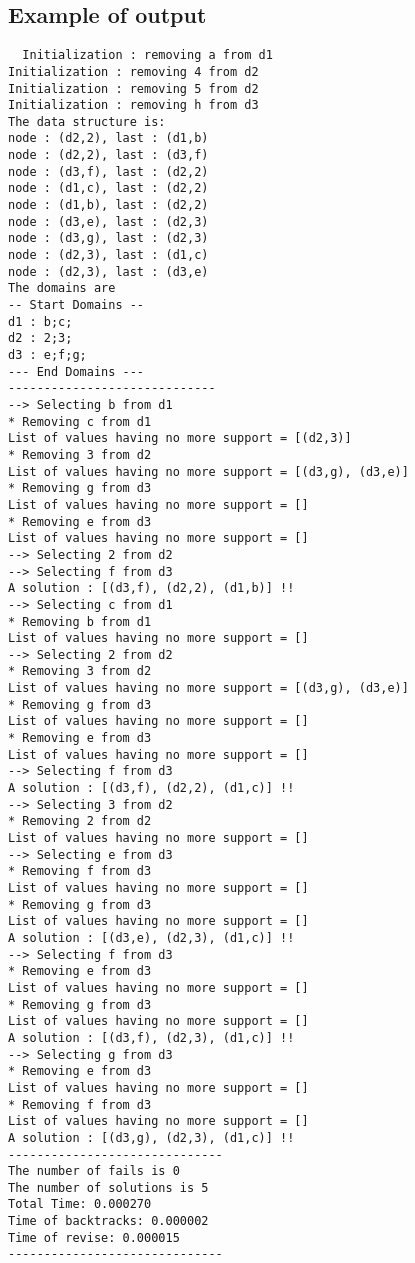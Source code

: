 \documentclass{rapport}
\begin{document}
\subsection{Example of output}
\label{sec:output_ex}

\begin{verbatim}
  Initialization : removing a from d1  
Initialization : removing 4 from d2
Initialization : removing 5 from d2
Initialization : removing h from d3
The data structure is:
node : (d2,2), last : (d1,b) 
node : (d2,2), last : (d3,f) 
node : (d3,f), last : (d2,2) 
node : (d1,c), last : (d2,2) 
node : (d1,b), last : (d2,2) 
node : (d3,e), last : (d2,3) 
node : (d3,g), last : (d2,3) 
node : (d2,3), last : (d1,c) 
node : (d2,3), last : (d3,e) 
The domains are
-- Start Domains --
d1 : b;c;
d2 : 2;3;
d3 : e;f;g;
--- End Domains ---
-----------------------------
--> Selecting b from d1
* Removing c from d1
List of values having no more support = [(d2,3)]
* Removing 3 from d2
List of values having no more support = [(d3,g), (d3,e)]
* Removing g from d3
List of values having no more support = []
* Removing e from d3
List of values having no more support = []
--> Selecting 2 from d2
--> Selecting f from d3
A solution : [(d3,f), (d2,2), (d1,b)] !!
--> Selecting c from d1
* Removing b from d1
List of values having no more support = []
--> Selecting 2 from d2
* Removing 3 from d2
List of values having no more support = [(d3,g), (d3,e)]
* Removing g from d3
List of values having no more support = []
* Removing e from d3
List of values having no more support = []
--> Selecting f from d3
A solution : [(d3,f), (d2,2), (d1,c)] !!
--> Selecting 3 from d2
* Removing 2 from d2
List of values having no more support = []
--> Selecting e from d3
* Removing f from d3
List of values having no more support = []
* Removing g from d3
List of values having no more support = []
A solution : [(d3,e), (d2,3), (d1,c)] !!
--> Selecting f from d3
* Removing e from d3
List of values having no more support = []
* Removing g from d3
List of values having no more support = []
A solution : [(d3,f), (d2,3), (d1,c)] !!
--> Selecting g from d3
* Removing e from d3
List of values having no more support = []
* Removing f from d3
List of values having no more support = []
A solution : [(d3,g), (d2,3), (d1,c)] !!
------------------------------
The number of fails is 0
The number of solutions is 5
Total Time: 0.000270
Time of backtracks: 0.000002
Time of revise: 0.000015
------------------------------
\end{verbatim}
\end{document}
